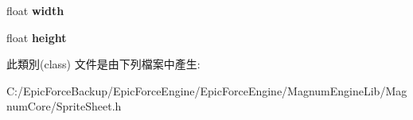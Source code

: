 \begin{DoxyCompactItemize}
\item 
float {\bfseries width}\hypertarget{class_magnum_1_1_sprite_sheet_1_1_resource_importer_1_1_quad_buffer_a9bf8621b3ea26b49642b643800540353}{}\label{class_magnum_1_1_sprite_sheet_1_1_resource_importer_1_1_quad_buffer_a9bf8621b3ea26b49642b643800540353}

\item 
float {\bfseries height}\hypertarget{class_magnum_1_1_sprite_sheet_1_1_resource_importer_1_1_quad_buffer_a138e885d832fb61cc783bafd2d839233}{}\label{class_magnum_1_1_sprite_sheet_1_1_resource_importer_1_1_quad_buffer_a138e885d832fb61cc783bafd2d839233}

\end{DoxyCompactItemize}


此類別(class) 文件是由下列檔案中產生\+:\begin{DoxyCompactItemize}
\item 
C\+:/\+Epic\+Force\+Backup/\+Epic\+Force\+Engine/\+Epic\+Force\+Engine/\+Magnum\+Engine\+Lib/\+Magnum\+Core/Sprite\+Sheet.\+h\end{DoxyCompactItemize}
